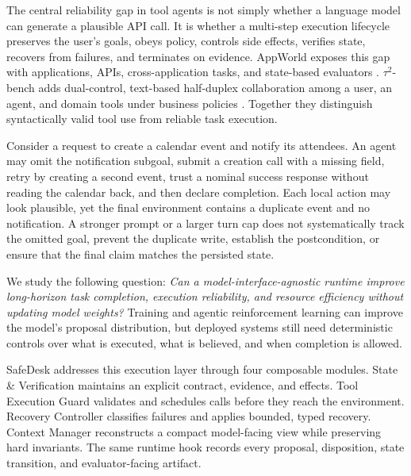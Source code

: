 \documentclass[10pt]{article}
\newcommand{\safedesk}{SafeDesk}
\begin{document}
The central reliability gap in tool agents is not simply whether a language model
can generate a plausible API call. It is whether a multi-step execution lifecycle
preserves the user's goals, obeys policy, controls side effects, verifies state,
recovers from failures, and terminates on evidence. AppWorld exposes this gap with
\AWAppCount{} applications, \AWAPICount{} APIs, cross-application tasks, and
state-based evaluators \citep{trivedi2024appworld}. $\tau^2$-bench adds dual-control,
text-based half-duplex collaboration among a user, an agent, and domain tools
under business policies \citep{barres2025tau2,yao2024taubench}. Together they
distinguish syntactically valid tool use
from reliable task execution.

Consider a request to create a calendar event and notify its attendees. An agent
may omit the notification subgoal, submit a creation call with a missing field,
retry by creating a second event, trust a nominal success response without reading
the calendar back, and then declare completion. Each local action may look
plausible, yet the final environment contains a duplicate event and no notification.
A stronger prompt or a larger turn cap does not systematically track the omitted
goal, prevent the duplicate write, establish the postcondition, or ensure that the
final claim matches the persisted state.

We study the following question: \emph{Can a model-interface-agnostic runtime improve
long-horizon task completion, execution reliability, and resource efficiency
without updating model weights?} Training and agentic reinforcement learning can
improve the model's proposal distribution, but deployed systems still need
deterministic controls over what is executed, what is believed, and when completion
is allowed.

\safedesk{} addresses this execution layer through four composable modules. State
\& Verification maintains an explicit contract, evidence, and effects. Tool
Execution Guard validates and schedules calls before they reach the environment.
Recovery Controller classifies failures and applies bounded, typed recovery.
Context Manager reconstructs a compact model-facing view while preserving hard
invariants. The same runtime hook records every proposal, disposition, state
transition, and evaluator-facing artifact.
\end{document}
